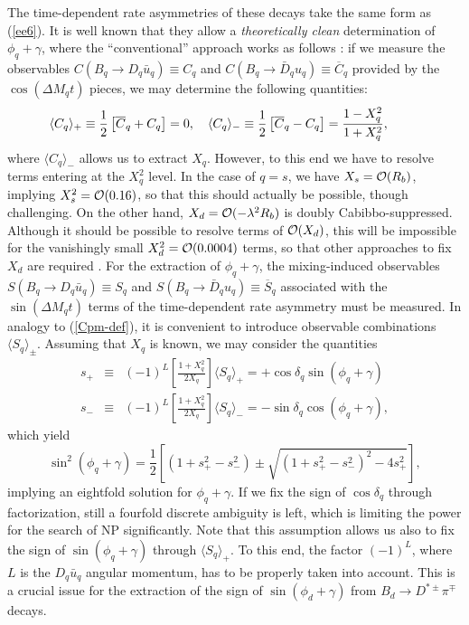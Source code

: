 \documentclass[12pt]{article}
\begin{document}
The time-dependent rate asymmetries of these decays take the same form
as (\ref{ee6}).  It is well known that they allow a {\it theoretically 
clean} determination of $\phi_q+\gamma$, where the ``conventional'' 
approach works as follows \cite{BsDsK,BdDpi}: 
if we measure the observables 
$C(B_q\to D_q\bar u_q)\equiv C_q$ 
and $C(B_q\to \bar D_q u_q)\equiv \overline{C}_q$ provided by the
$\cos(\Delta M_qt)$ pieces, we may determine the following quantities:
\begin{equation}\label{Cpm-def}
\hspace*{-0.9truecm}
\langle C_q\rangle_+\equiv
\frac{1}{2}\left[\overline{C}_q+ C_q\right]=0, \quad
\langle C_q\rangle_-\equiv
\frac{1}{2}\left[\overline{C}_q-C_q\right]=\frac{1-X_q^2}{1+X_q^2},
\end{equation}
where $\langle C_q\rangle_-$ allows us to extract $X_q$. However, to this
end we have to resolve terms entering at the $X_q^2$ level. In the case 
of $q=s$, we have $X_s={\cal O}(R_b)$, implying $X_s^2={\cal O}(0.16)$, so 
that this should actually be possible, though challenging. On the other hand, 
$X_d={\cal O}(-\lambda^2R_b)$ is doubly Cabibbo-suppressed. Although it 
should be possible to resolve terms of ${\cal O}(X_d)$, this will be 
impossible for the vanishingly small $X_d^2={\cal O}(0.0004)$ 
terms, so that other approaches to fix $X_d$ are required
\cite{BdDpi}. For the extraction of $\phi_q+\gamma$, the 
mixing-induced observables $S(B_q\to D_q\bar u_q)\equiv S_q$ and 
$S(B_q\to \bar D_q u_q)\equiv \overline{S}_q$ associated with the
$\sin(\Delta M_qt)$ terms of the time-dependent rate asymmetry must be 
measured. In analogy to (\ref{Cpm-def}), it is convenient to
introduce observable combinations $\langle S_q\rangle_\pm$. Assuming 
that $X_q$ is known, we may consider the quantities
\begin{eqnarray}
s_+&\equiv& (-1)^L
\left[\frac{1+X_q^2}{2 X_q}\right]\langle S_q\rangle_+
=+\cos\delta_q\sin(\phi_q+\gamma)\\
s_-&\equiv&(-1)^L
\left[\frac{1+X_q^2}{2X_q}\right]\langle S_q\rangle_-
=-\sin\delta_q\cos(\phi_q+\gamma),
\end{eqnarray}
which yield
\begin{equation}\label{conv-extr}
\sin^2(\phi_q+\gamma)=\frac{1}{2}\left[(1+s_+^2-s_-^2) \pm
\sqrt{(1+s_+^2-s_-^2)^2-4s_+^2}\right],
\end{equation}
implying an eightfold solution for $\phi_q+\gamma$. If we fix the sign of
$\cos\delta_q$ through factorization,  still a fourfold discrete ambiguity is left,
which is limiting the power for the search of NP significantly.  
Note that this assumption allows us also 
to fix the sign of $\sin(\phi_q+\gamma)$ through $\langle S_q\rangle_+$. 
To this end, the factor $(-1)^L$, where $L$ is the $D_q\bar u_q$ 
angular momentum, has to be properly taken into account. 
This is a crucial issue for the extraction of 
the sign of $\sin(\phi_d+\gamma)$ from $B_d\to D^{\ast\pm}\pi^\mp$ decays.
\end{document}
